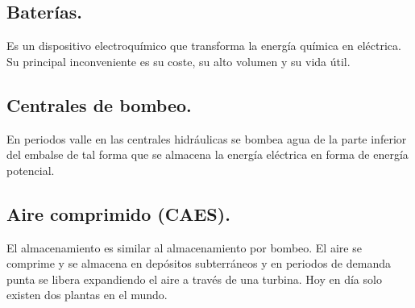 \subsection{Baterías.}
Es un dispositivo electroquímico que transforma la energía química en eléctrica. Su principal inconveniente es su coste, su alto volumen y su vida útil.
\subsection{Centrales de bombeo.}
En periodos valle en las centrales hidráulicas se bombea agua de la parte inferior del embalse de tal forma que se almacena la energía eléctrica en forma de energía potencial.
\subsection{Aire comprimido (CAES).}
El almacenamiento es similar al almacenamiento por bombeo. El aire se comprime y se almacena en depósitos subterráneos y en periodos de demanda punta se libera expandiendo el aire a través de una turbina. Hoy en día solo existen dos plantas en el mundo.